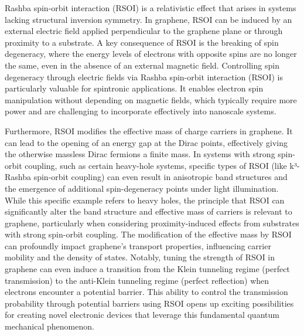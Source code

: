 Rashba spin-orbit interaction (RSOI) is a relativistic effect that arises in systems lacking structural inversion symmetry\cite{AvishaiPhysRevB2021}.
In graphene, RSOI can be induced by an external electric field applied perpendicular to the graphene plane or through proximity to a substrate\cite{ShcherbakovSciAdv2021}.
A key consequence of RSOI is the breaking of spin degeneracy, where the energy levels of electrons with opposite spins are no longer the same, even in the absence of an external magnetic field\cite{DelkhoshPhysE2015}.
Controlling spin degeneracy through electric fields via Rashba spin-orbit interaction (RSOI) is particularly valuable for spintronic applications.
It enables electron spin manipulation without depending on magnetic fields, which typically require more power and are challenging to incorporate effectively into nanoscale systems.


Furthermore, RSOI modifies the effective mass of charge carriers in graphene.
It can lead to the opening of an energy gap at the Dirac points, effectively giving the otherwise massless Dirac fermions a finite mass.
In systems with strong spin-orbit coupling, such as certain heavy-hole systems, specific types of RSOI (like k³-Rashba spin-orbit coupling) can even result in anisotropic band structures and the emergence of additional spin-degeneracy points under light illumination.
While this specific example refers to heavy holes, the principle that RSOI can significantly alter the band structure and effective mass of carriers is relevant to graphene, particularly when considering proximity-induced effects from substrates with strong spin-orbit coupling\cite{GindikinPhysRevB2025}.
The modification of the effective mass by RSOI can profoundly impact graphene's transport properties, influencing carrier mobility and the density of states.
Notably, tuning the strength of RSOI in graphene can even induce a transition from the Klein tunneling regime (perfect transmission) to the anti-Klein tunneling regime (perfect reflection) when electrons encounter a potential barrier.
This ability to control the transmission probability through potential barriers using RSOI opens up exciting possibilities for creating novel electronic devices that leverage this fundamental quantum mechanical phenomenon\cite{YaoMater2024}.





